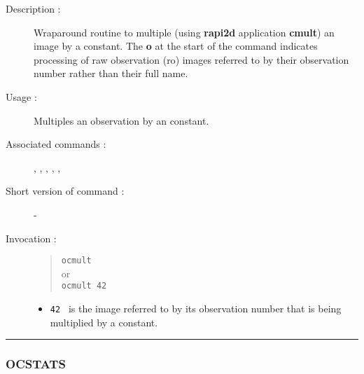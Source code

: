 \begin{description}

\item[Description :] Wraparound routine to multiple (using {\bf rapi2d}
application {\bf cmult}) an image by a constant. The {\bf o} at the
start of the command indicates processing of raw observation ({\sc ro})
images referred to by their observation number rather than their full
name.

\item[Usage :] Multiples an observation by an constant.

\item[Associated commands :] {\tt {}},
{\tt {}}, {\tt {}},
{\tt {}}, {\tt {}}, {\tt {}}

\item[Short version of command :] -
\item[Invocation :]

\begin{quote}{\tt  ocmult }\\
or \\
{\tt ocmult 42 }
\end{quote}

\begin{itemize}

\item {\tt 42 } is the image referred to by its observation number that
is being multiplied by a constant.
\end{itemize}

\end{description}

\hrule
\subsubsection*{\label{OCSTATS}OCSTATS}

